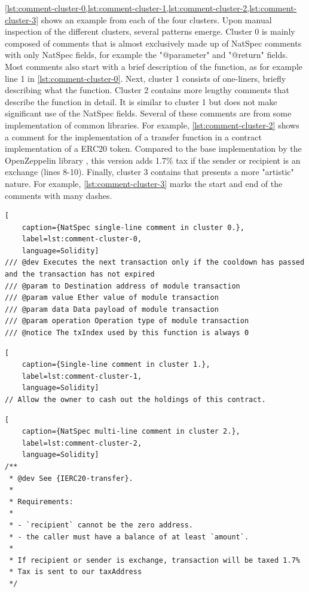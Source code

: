\cref{lst:comment-cluster-0,lst:comment-cluster-1,lst:comment-cluster-2,lst:comment-cluster-3} shows an example from each of the four clusters. Upon manual inspection of the different clusters, several patterns emerge. Cluster 0 is mainly composed of comments that is almost exclusively made up of NatSpec comments with only NatSpec fields, for example the "@parameter" and "@return" fields. Most comments also start with a brief description of the function, as for example line 1 in \cref{lst:comment-cluster-0}. Next, cluster 1 consists of one-liners, briefly describing what the function. Cluster 2 contains more lengthy comments that describe the function in detail. It is similar to cluster 1 but does not make significant use of the NatSpec fields. Several of these comments are from some implementation of common libraries. For example, \cref{lst:comment-cluster-2} shows a comment for the implementation of a transfer function in a contract implementation of a ERC20 token. Compared to the base implementation by the OpenZeppelin library \cite{openzeppelin}, this version adds 1.7\% tax if the sender or recipient is an exchange (lines 8-10). Finally, cluster 3 contains that presents a more "artistic" nature. For example, \cref{lst:comment-cluster-3} marks the start and end of the comments with many dashes.


\begin{lstlisting}[
    caption={NatSpec single-line comment in cluster 0.},
    label=lst:comment-cluster-0,
    language=Solidity]
/// @dev Executes the next transaction only if the cooldown has passed and the transaction has not expired
/// @param to Destination address of module transaction
/// @param value Ether value of module transaction
/// @param data Data payload of module transaction
/// @param operation Operation type of module transaction
/// @notice The txIndex used by this function is always 0
\end{lstlisting}

\begin{lstlisting}[
    caption={Single-line comment in cluster 1.},
    label=lst:comment-cluster-1,
    language=Solidity]
// Allow the owner to cash out the holdings of this contract.
\end{lstlisting}

\begin{lstlisting}[
    caption={NatSpec multi-line comment in cluster 2.},
    label=lst:comment-cluster-2,
    language=Solidity]
/**
 * @dev See {IERC20-transfer}.
 *
 * Requirements:
 *
 * - `recipient` cannot be the zero address.
 * - the caller must have a balance of at least `amount`.
 * 
 * If recipient or sender is exchange, transaction will be taxed 1.7%
 * Tax is sent to our taxAddress
 */
\end{lstlisting}

